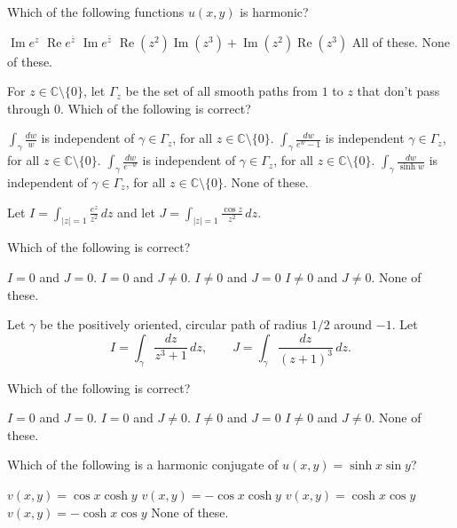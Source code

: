 \documentclass[12pt]{exam}
\newcommand{\CC}{\mathbb{C}}
\begin{document}
\begin{questions}
\question
Which of the following functions $u(x,y)$ is harmonic?
\begin{choices}
    \choice $\operatorname{Im} e^z$
    \choice $\operatorname{Re} e^{\bar z}$
    \choice $\operatorname{Im} e^{\bar z}$
    \choice $\operatorname{Re}(z^2)\operatorname{Im}(z^3) + \operatorname{Im}(z^2)\operatorname{Re}(z^3)$
    \choice All of these.
    \choice None of these.
\end{choices}

\question
For $z\in\CC\setminus\{0\}$, let $\Gamma_z$ be the set of all smooth paths from $1$ to $z$ that don't pass through $0$.
Which of the following is correct?
\begin{choices}
    \choice $\displaystyle \int_\gamma\frac{dw}w$ is independent of $\gamma\in\Gamma_z$, for all $z\in\CC\setminus\{0\}$.
    \choice $\displaystyle \int_\gamma\frac{dw}{e^w-1}$ is independent $\gamma\in\Gamma_z$, for all $z\in\CC\setminus\{0\}$.
    \choice $\displaystyle \int_\gamma\frac{dw}{e^{-w}}$ is independent of $\gamma\in\Gamma_z$, for all $z\in\CC\setminus\{0\}$.
    \choice $\displaystyle \int_\gamma\frac{dw}{\sinh w}$ is independent of $\gamma\in\Gamma_z$, for all $z\in\CC\setminus\{0\}$.
    \choice None of these.
\end{choices}

\question
Let
    $\displaystyle I = \int_{|z|=1}\frac{e^z}{z^2}\,dz$
    and let
    $\displaystyle J = \int_{|z|=1}\frac{\cos z}{z^2}\,dz.$

Which of the following is correct?
\begin{choices}
    \choice $I=0$ and $J=0$.
    \choice $I=0$ and $J\neq 0$.
    \choice $I\neq 0$ and $J=0$
    \choice $I\neq 0$ and $J\neq 0$.
    \choice None of these.
\end{choices}

\question
Let $\gamma$ be the positively oriented, circular path of radius $1/2$ around $-1$.
Let
    $$I = \int_{\gamma}\frac{dz}{z^3+1}\,dz,\qquad
    J = \int_{\gamma}\frac{dz}{(z+1)^3}\,dz.$$

Which of the following is correct?
\begin{choices}
    \choice $I=0$ and $J=0$.
    \choice $I=0$ and $J\neq 0$.
    \choice $I\neq 0$ and $J=0$
    \choice $I\neq 0$ and $J\neq 0$.
    \choice None of these.
\end{choices}

\question
Which of the following is a harmonic conjugate of $u(x,y)=\sinh x\sin y$?
\begin{choices}
    \choice $v(x,y)=\cos x\cosh y$
    \choice $v(x,y)=-\cos x\cosh y$
    \choice $v(x,y)=\cosh x\cos y$
    \choice $v(x,y)=-\cosh x\cos y$
    \choice None of these.
\end{choices}


\end{questions}
\end{document}
